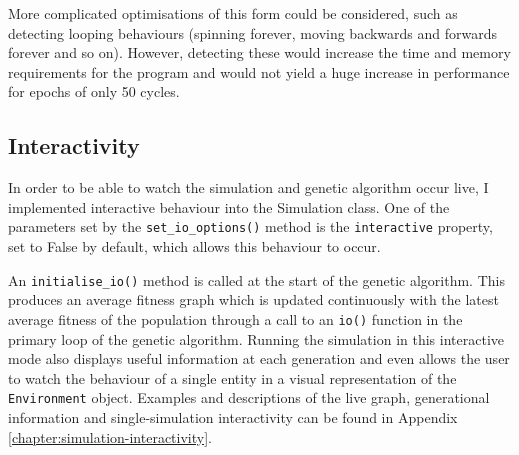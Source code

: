 \documentclass[12pt,a4paper,twoside,openright]{report}
\begin{document}
More complicated optimisations of this form could be considered, such as detecting looping behaviours (spinning forever, moving backwards and forwards forever and so on). However, detecting these would increase the time and memory requirements for the program and would  not yield a huge increase in performance for epochs of only 50 cycles.

\subsection{Interactivity}\label{section:interactivity}

In order to be able to watch the simulation and genetic algorithm occur live, I implemented interactive behaviour into the Simulation class. One of the parameters set by the \texttt{set\_io\_options()} method is the \texttt{interactive} property, set to False by default, which allows this behaviour to occur.

An \texttt{initialise\_io()} method is called at the start of the genetic algorithm. This produces an average fitness graph which is updated continuously with the latest average fitness of the population through a call to an \texttt{io()} function in the primary loop of the genetic algorithm. Running the simulation in this interactive mode also displays useful information at each generation and even allows the user to watch the behaviour of a single entity in a visual representation of the \texttt{Environment} object. Examples and descriptions of the live graph, generational information and single-simulation interactivity can be found in Appendix \ref{chapter:simulation-interactivity}.


\end{document}
